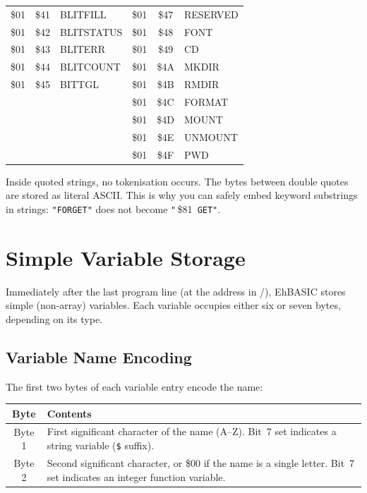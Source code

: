 \begin{center}
\begin{longtable}{ccl|ccl}
\$01 & \$41 & BLITFILL    & \$01 & \$47 & RESERVED    \\
\$01 & \$42 & BLITSTATUS  & \$01 & \$48 & FONT        \\
\$01 & \$43 & BLITERR     & \$01 & \$49 & CD          \\
\$01 & \$44 & BLITCOUNT   & \$01 & \$4A & MKDIR       \\
\$01 & \$45 & BITTGL      & \$01 & \$4B & RMDIR       \\
     &      &             & \$01 & \$4C & FORMAT      \\
     &      &             & \$01 & \$4D & MOUNT       \\
     &      &             & \$01 & \$4E & UNMOUNT     \\
     &      &             & \$01 & \$4F & PWD         \\
\bottomrule
\end{longtable}
\end{center}

\begin{notebox}
Inside quoted strings, no tokenisation occurs.  The bytes between double
quotes are stored as literal ASCII.  This is why you can safely embed keyword
substrings in strings: \texttt{"FORGET"} does not become \texttt{"}\,\$81\,%
\texttt{GET"}.
\end{notebox}

\section{Simple Variable Storage}

Immediately after the last program line (at the address in
/), EhBASIC stores simple (non-array) variables.  Each
variable occupies either six or seven bytes, depending on its type.

\subsection{Variable Name Encoding}

The first two bytes of each variable entry encode the name:

\begin{center}
\begin{tabular}{cp{28em}}
\toprule
\textbf{Byte} & \textbf{Contents} \\
\midrule
Byte 1 & First significant character of the name (A--Z).
         Bit~7 set indicates a string variable (\texttt{\$} suffix). \\
Byte 2 & Second significant character, or \$00 if the name is a single
         letter.  Bit~7 set indicates an integer function variable. \\
\bottomrule
\end{tabular}
\end{center}

